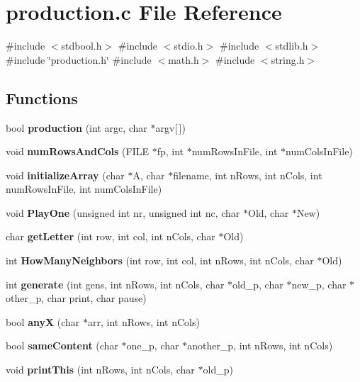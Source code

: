 \section{production.\+c File Reference}
\label{production_8c}
{\ttfamily \#include $<$stdbool.\+h$>$}\newline
{\ttfamily \#include $<$stdio.\+h$>$}\newline
{\ttfamily \#include $<$stdlib.\+h$>$}\newline
{\ttfamily \#include \char`\"{}production.\+h\char`\"{}}\newline
{\ttfamily \#include $<$math.\+h$>$}\newline
{\ttfamily \#include $<$string.\+h$>$}\newline
\subsection*{Functions}
\begin{DoxyCompactItemize}
\item 
bool \textbf{ production} (int argc, char $\ast$argv[$\,$])
\item 
void \textbf{ num\+Rows\+And\+Cols} (F\+I\+LE $\ast$fp, int $\ast$num\+Rows\+In\+File, int $\ast$num\+Cols\+In\+File)
\item 
void \textbf{ initialize\+Array} (char $\ast$A, char $\ast$filename, int n\+Rows, int n\+Cols, int num\+Rows\+In\+File, int num\+Cols\+In\+File)
\item 
void \textbf{ Play\+One} (unsigned int nr, unsigned int nc, char $\ast$Old, char $\ast$New)
\item 
char \textbf{ get\+Letter} (int row, int col, int n\+Cols, char $\ast$Old)
\item 
int \textbf{ How\+Many\+Neighbors} (int row, int col, int n\+Rows, int n\+Cols, char $\ast$Old)
\item 
int \textbf{ generate} (int gens, int n\+Rows, int n\+Cols, char $\ast$old\+\_\+p, char $\ast$new\+\_\+p, char $\ast$other\+\_\+p, char print, char pause)
\item 
bool \textbf{ anyX} (char $\ast$arr, int n\+Rows, int n\+Cols)
\item 
bool \textbf{ same\+Content} (char $\ast$one\+\_\+p, char $\ast$another\+\_\+p, int n\+Rows, int n\+Cols)
\item 
void \textbf{ print\+This} (int n\+Rows, int n\+Cols, char $\ast$old\+\_\+p)
\end{DoxyCompactItemize}


